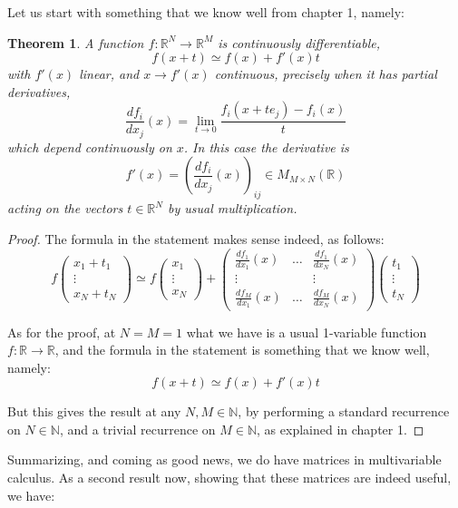 \documentclass[12pt]{amsbook}
\newtheorem{theorem}{Theorem}[chapter]
\begin{document}
\bigskip

Let us start with something that we know well from chapter 1, namely:


\begin{theorem}
A function $f:\mathbb R^N\to\mathbb R^M$ is continuously differentiable,
$$f(x+t)\simeq f(x)+f'(x)t$$
with $f'(x)$ linear, and $x\to f'(x)$ continuous, precisely when it has partial derivatives,
$$\frac{df_i}{dx_j}(x)=\lim_{t\to 0}\frac{f_i(x+te_j)-f_i(x)}{t}$$
which depend continuously on $x$. In this case the derivative is
$$f'(x)=\left(\frac{df_i}{dx_j}(x)\right)_{ij}\in M_{M\times N}(\mathbb R)$$ 
acting on the vectors $t\in\mathbb R^N$ by usual multiplication.
\end{theorem}

\begin{proof}
The formula in the statement makes sense indeed, as follows:
$$f\begin{pmatrix}x_1+t_1\\ \vdots\\ x_N+t_N\end{pmatrix}
\simeq f\begin{pmatrix}x_1\\ \vdots\\ x_N\end{pmatrix}
+\begin{pmatrix}
\frac{df_1}{dx_1}(x)&\ldots&\frac{df_1}{dx_N}(x)\\
\vdots&&\vdots\\
\frac{df_M}{dx_1}(x)&\ldots&\frac{df_M}{dx_N}(x)
\end{pmatrix}\begin{pmatrix}t_1\\ \vdots\\ t_N\end{pmatrix}$$

As for the proof, at $N=M=1$ what we have is a usual 1-variable function $f:\mathbb R\to\mathbb R$, and the formula in the statement is something that we know well, namely:
$$f(x+t)\simeq f(x)+f'(x)t$$

But this gives the result at any $N,M\in\mathbb N$, by performing a standard recurrence on $N\in\mathbb N$, and a trivial recurrence on $M\in\mathbb N$, as explained in chapter 1.
\end{proof}

Summarizing, and coming as good news, we do have matrices in multivariable calculus. As a second result now, showing that these matrices are indeed useful, we have:
\end{document}
